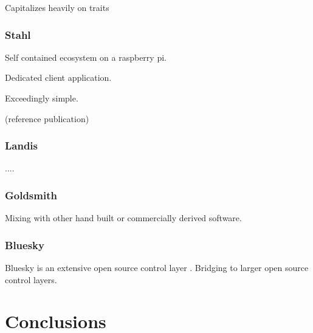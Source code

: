 \documentclass{article}
\begin{document}
Capitalizes heavily on traits

\subsubsection{Stahl}

Self contained ecosystem on a raspberry pi.

Dedicated client application.

Exceedingly simple.

(reference publication)

\subsubsection{Landis}

....

\subsubsection{Goldsmith}

Mixing with other hand built or commercially derived software.

\subsubsection{Bluesky}

Bluesky is an extensive open source control layer \cite{AllanDanielB2019a}.
Bridging to larger open source control layers.

\section{Conclusions}

\clearpage


\end{document}
